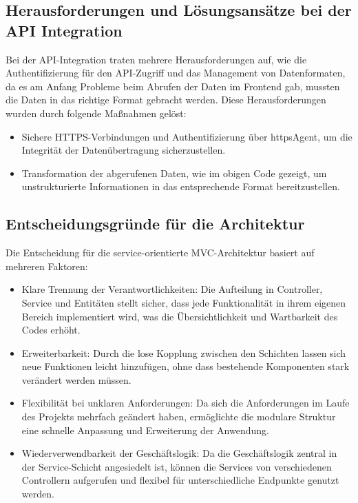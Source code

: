 \subsection*{Herausforderungen und Lösungsansätze bei der API Integration}
Bei der API-Integration traten mehrere Herausforderungen auf, wie die Authentifizierung für den API-Zugriff und das Management von Datenformaten, da es am Anfang Probleme beim Abrufen der Daten im Frontend gab, mussten die Daten in das richtige Format gebracht werden. Diese Herausforderungen wurden durch folgende Maßnahmen gelöst:
\begin{itemize}
    \item Sichere HTTPS-Verbindungen und Authentifizierung über httpsAgent, um die Integrität der Datenübertragung sicherzustellen.
    \item Transformation der abgerufenen Daten, wie im obigen Code gezeigt, um unstrukturierte Informationen in das entsprechende Format bereitzustellen.
\end{itemize}
\subsection*{Entscheidungsgründe für die Architektur}
Die Entscheidung für die service-orientierte MVC-Architektur basiert auf mehreren Faktoren:
\begin{itemize}
    \item Klare Trennung der Verantwortlichkeiten: Die Aufteilung in Controller, Service und Entitäten stellt sicher, dass jede Funktionalität in ihrem eigenen Bereich implementiert wird, was die Übersichtlichkeit und Wartbarkeit des Codes erhöht.
    \item Erweiterbarkeit: Durch die lose Kopplung zwischen den Schichten lassen sich neue Funktionen leicht hinzufügen, ohne dass bestehende Komponenten stark verändert werden müssen.
    \item Flexibilität bei unklaren Anforderungen: Da sich die Anforderungen im Laufe des Projekts mehrfach geändert haben, ermöglichte die modulare Struktur eine schnelle Anpassung und Erweiterung der Anwendung.
    \item Wiederverwendbarkeit der Geschäftslogik: Da die Geschäftslogik zentral in der Service-Schicht angesiedelt ist, können die Services von verschiedenen Controllern aufgerufen und flexibel für unterschiedliche Endpunkte genutzt werden.
\end{itemize}
\label{chap:kapitel6}